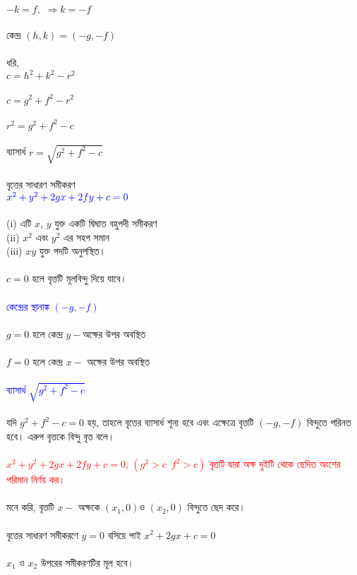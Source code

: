 \documentclass{article}
\begin{document}
\\
$-k=f,\,\,\Rightarrow k=-f$\\
\\
কেন্দ্র $(h,k)=(-g,-f)$\\
\\ 
ধরি,\\
$c=h^2+k^2-r^2$\\
\\
$c=g^2+f^2-r^2$\\
\\ 
$r^2=g^2+f^2-c$\\
\\ 
ব্যাসার্ধ $r=\sqrt{g^2+f^2-c}$\\
\\ 
বৃত্তের সাধারণ সমীকরণ \\
$\textcolor{blue}{x^2+y^2+2gx+2fy+c=0}$\\
\\ 
(i) এটি $x$, $y$ যুক্ত একটি দ্বিঘাত বহুপদী সমীকরণ \\
(ii) $x^2$ এবং $y^2$ এর সহগ সমান\\
(iii) $xy$ যুক্ত পদটি অনুপস্থিত। \\
\\
$c=0$ হলে বৃত্তটি মূলবিন্দু দিয়ে যাবে।\\
\\ 
\textcolor{blue}{কেন্দ্রের স্থানাঙ্ক	$(-g,-f)$}\\
\\
$g=0$ হলে কেন্দ্র $y-$অক্ষের উপর অবস্থিত\\
\\
$f=0$ হলে কেন্দ্র $x-$  অক্ষের উপর অবস্থিত\\ 
\\ 
\textcolor{blue}{ব্যাসার্ধ	$\sqrt{g^2+f^2-c}$}\\
\\
যদি $g^2+f^2-c=0$ হয়, তাহলে বৃত্তের ব্যাসার্ধ শূন্য হবে এবং এক্ষেত্রে বৃত্তটি  $(-g,-f)$ বিন্দুতে পরিনত হবে। এরুপ বৃত্তকে বিন্দু বৃত্ত বলে। \\
\\ 
\textcolor{red}{$x^2+y^2+2gx+2fy+c=0$, $(g^2>c\,\,\,f^2>c)$ বৃত্তটি দ্বারা অক্ষ দুইটি থেকে ছেদিত অংশের পরিমান নির্ণয় কর। }\\
\\
মনে করি, বৃত্তটি $x-$ অক্ষকে $(x_1,0)$ও $(x_2,0)$ বিন্দুতে ছেদ করে। \\
\\
বৃত্তের সাধারণ সমীকরণে $y=0$ বসিয়ে পাই $x^2+2gx+c=0$\\
\\
$x_1$ ও $x_2$ উপরের সমীকরণটির মূল হবে। \\
\end{document}
